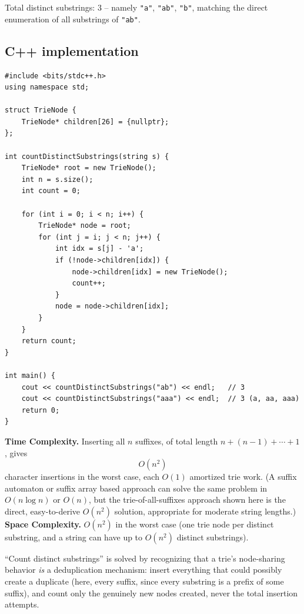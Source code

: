 Total distinct substrings: $3$ -- namely \texttt{"a"}, \texttt{"ab"},
\texttt{"b"}, matching the direct enumeration of all substrings of
\texttt{"ab"}.

\subsection*{C++ implementation}

\begin{lstlisting}
#include <bits/stdc++.h>
using namespace std;

struct TrieNode {
    TrieNode* children[26] = {nullptr};
};

int countDistinctSubstrings(string s) {
    TrieNode* root = new TrieNode();
    int n = s.size();
    int count = 0;

    for (int i = 0; i < n; i++) {
        TrieNode* node = root;
        for (int j = i; j < n; j++) {
            int idx = s[j] - 'a';
            if (!node->children[idx]) {
                node->children[idx] = new TrieNode();
                count++;
            }
            node = node->children[idx];
        }
    }
    return count;
}

int main() {
    cout << countDistinctSubstrings("ab") << endl;   // 3
    cout << countDistinctSubstrings("aaa") << endl;  // 3 (a, aa, aaa)
    return 0;
}
\end{lstlisting}

\begin{complexitybox}
\textbf{Time Complexity.} Inserting all $n$ suffixes, of total length
$n + (n-1) + \cdots + 1$, gives
\[
  O(n^2)
\]
character insertions in the worst case, each $O(1)$ amortized trie work.
(A suffix automaton or suffix array based approach can solve the same
problem in $O(n \log n)$ or $O(n)$, but the trie-of-all-suffixes
approach shown here is the direct, easy-to-derive $O(n^2)$ solution,
appropriate for moderate string lengths.)
\textbf{Space Complexity.} $O(n^2)$ in the worst case (one trie node per
distinct substring, and a string can have up to $O(n^2)$ distinct
substrings).
\end{complexitybox}

\begin{takeawaybox}
``Count distinct substrings'' is solved by recognizing that a trie's
node-sharing behavior \emph{is} a deduplication mechanism: insert
everything that could possibly create a duplicate (here, every suffix,
since every substring is a prefix of some suffix), and count only the
genuinely new nodes created, never the total insertion attempts.
\end{takeawaybox}
